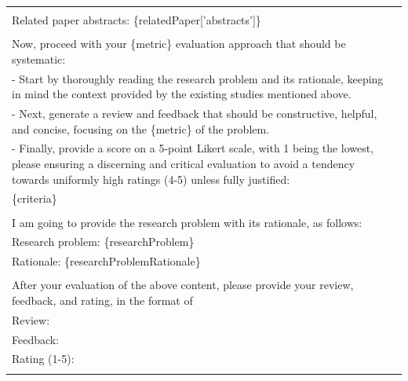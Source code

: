 \documentclass[11pt]{article}
\begin{document}
\begin{table}
{\begin{tabular}{ll}
{            \multicolumn{1}{p{.92\textwidth}}{{Related paper titles: \{relatedPaper['titles']\}}} \\
            \multicolumn{1}{p{.92\textwidth}}{{Related paper abstracts: \{relatedPaper['abstracts']\} }} \\ \\
            \multicolumn{1}{p{.92\textwidth}}{{Now, proceed with your \{metric\} evaluation approach that should be systematic:}} \\
            \multicolumn{1}{p{.92\textwidth}}{{- Start by thoroughly reading the research problem and its rationale, keeping in mind the context provided by the existing studies mentioned above.}} \\
            \multicolumn{1}{p{.92\textwidth}}{{- Next, generate a review and feedback that should be constructive, helpful, and concise, focusing on the \{metric\} of the problem.}} \\
            \multicolumn{1}{p{.92\textwidth}}{{- Finally, provide a score on a 5-point Likert scale, with 1 being the lowest, please ensuring a discerning and critical evaluation to avoid a tendency towards uniformly high ratings (4-5) unless fully justified:}} \\ 
            \multicolumn{1}{p{.92\textwidth}}{{\{criteria\}}} \\ \\
            \multicolumn{1}{p{.92\textwidth}}{{I am going to provide the research problem with its rationale, as follows:}} \\
            \multicolumn{1}{p{.92\textwidth}}{{Research problem: \{researchProblem\}}} \\
            \multicolumn{1}{p{.92\textwidth}}{{Rationale: \{researchProblemRationale\}}} \\ \\
            \multicolumn{1}{p{.92\textwidth}}{{After your evaluation of the above content, please provide your review, feedback, and rating, in the format of}} \\ 
            \multicolumn{1}{p{.92\textwidth}}{{Review: }} \\
            \multicolumn{1}{p{.92\textwidth}}{{Feedback: }} \\
            \multicolumn{1}{p{.92\textwidth}}{{Rating (1-5): }} \\
        } \\
        \bottomrule
        \end{tabular}
    }
\end{table}
\end{document}
